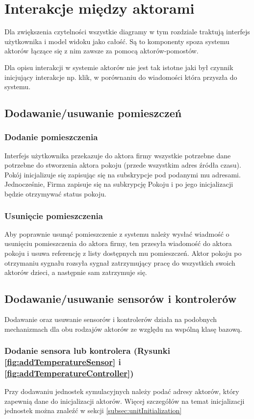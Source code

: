 \chapter{Interakcje między aktorami}
Dla zwiększenia czytelności wszystkie diagramy w tym rozdziale traktują  interfejs użytkownika i model widoku jako całość. Są to komponenty spoza systemu aktorów łączące się z nim zawsze za pomocą aktorów-pomostów.

Dla opisu interakcji w systemie aktorów nie jest tak istotne jaki był czynnik inicjujący interakcje np. klik, w porównaniu do wiadomości która przyszła do systemu.

\section{Dodawanie/usuwanie pomieszczeń}
\subsection*{Dodanie pomieszczenia }
Interfejs użytkownika przekazuje do aktora firmy wszystkie potrzebne dane potrzebne do stworzenia aktora pokoju (przede wszystkim adres źródła czasu).
Pokój inicjalizuje się zapisując się na subskrypcje pod podanymi mu adresami.
Jednocześnie, Firma zapisuje się na subkrypcję Pokoju i po jego inicjalizacji będzie otrzymywać status pokoju.  


\subsection*{Usunięcie pomieszczenia }
Aby poprawnie usunąć pomieszczenie z systemu należy wysłać wiadmość o usunięciu pomieszczenia do aktora firmy, ten przesyła wiadomość do aktora pokoju i usuwa referencję z listy dostępnych mu pomieszczeń.
Aktor pokoju po otrzymaniu sygnału rozsyła sygnał zatrzymujący pracę do wszystkich swoich aktorów dzieci, a następnie sam zatrzymuje się.


\section{Dodawanie/usuwanie sensorów i kontrolerów}
Dodawanie oraz usuwanie sensorów i kontrolerów działa na podobnych mechanizmach dla obu rodzajów aktorów ze względu na wspólną klasę bazową.

\subsection*{Dodanie sensora lub kontrolera (Rysunki \ref{fig:addTemperatureSensor} i \ref{fig:addTemperatureController})} 
Przy dodawaniu jednostek symulacyjnych należy podać adresy aktorów, który zapewnią dane do inicjalizacji aktorów. Więcej szczegółów na temat inicjalizacji jednostek można znaleźć w sekcji \ref{subsec:unitInitialization}

